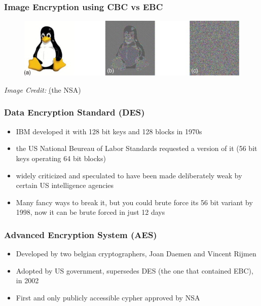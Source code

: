 \documentclass{beamer}
\begin{document}
\begin{frame}
    \frametitle{Image Encryption using CBC vs EBC}
    \begin{figure}
        \begin{center}
            \includegraphics[scale=0.6]{image_cbc.jpg}
        \end{center}
    \end{figure}
    \textit{Image Credit: }\href{https://www.sciencedirect.com/topics/computer-science/electronic-code-book}(the NSA)
\end{frame}

\begin{frame}
    \frametitle{Data Encryption Standard (DES)}
    \begin{itemize}
        \item \pause IBM developed it with 128 bit keys and 128 blocks in 1970s \pause
        \item the US National Beureau of Labor Standards requested a version of it (56 bit keys operating 64 bit blocks)\pause
        \item widely criticized and speculated to have been made deliberately weak by certain US intelligence agencies\pause
        \item Many fancy ways to break it, but you could brute force its 56 bit variant by 1998, now it can be brute forced in just 12 days \pause
    \end{itemize}
\end{frame}

\begin{frame}
    \frametitle{Advanced Encryption System (AES)}
    \begin{itemize}
        \item \pause Developed by two belgian cryptographers,  Joan Daemen and Vincent Rijmen \pause
        \item Adopted by US government, supersedes DES (the one that contained EBC), in 2002 \pause
        \item First and only publicly accessible cypher approved by NSA 
    \end{itemize}
    
\end{frame}
\end{document}
